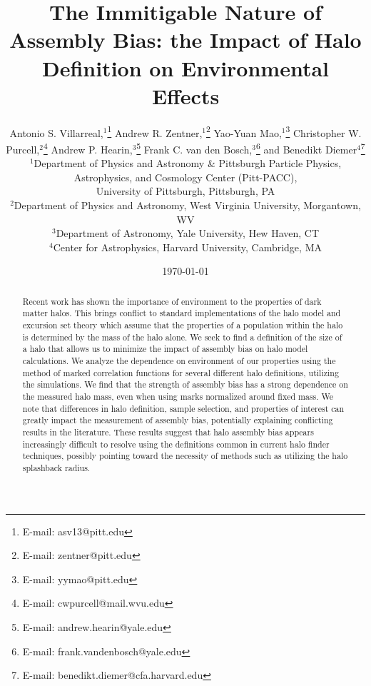 \documentclass[usenatbib,fleqn]{mnras}
\begin{document}
\title[The Immitigable Nature of Assembly Bias]{The Immitigable Nature of Assembly
Bias: the Impact of Halo Definition on Environmental Effects}
\author[A. Villarreal et al.]{%
Antonio S. Villarreal,$^{1}$\thanks{E-mail: asv13@pitt.edu}
Andrew R. Zentner,$^{1}$\thanks{E-mail: zentner@pitt.edu}
Yao-Yuan Mao,$^{1}$\thanks{E-mail: yymao@pitt.edu}
\newauthor
Christopher W. Purcell,$^{2}$\thanks{E-mail: cwpurcell@mail.wvu.edu}
Andrew P. Hearin,$^{3}$\thanks{E-mail: andrew.hearin@yale.edu}
Frank C. van den Bosch,$^{3}$\thanks{E-mail: frank.vandenbosch@yale.edu}
\newauthor
and Benedikt Diemer$^{4}$\thanks{E-mail: benedikt.diemer@cfa.harvard.edu}
\\
$^{1}$Department of Physics and Astronomy \& Pittsburgh Particle Physics, Astrophysics, and Cosmology Center (Pitt-PACC), \\
University of Pittsburgh, Pittsburgh, PA\\
$^{2}$Department of Physics and Astronomy, West Virginia University, Morgantown, WV \\
$^{3}$Department of Astronomy, Yale University, Hew Haven, CT\\
$^{4}$Center for Astrophysics, Harvard University, Cambridge, MA}

\date{\today}

\pagerange{\pageref{firstpage}--\pageref{lastpage}} 

\label{firstpage}

\maketitle

\begin{abstract}
Recent work has shown the importance of environment to the properties of dark matter halos. This brings conflict
to standard implementations of the halo model and excursion set theory which assume that the properties of a
population within the halo is determined by the mass of the halo alone. We seek to find a definition of the size
of a halo that allows us to minimize the impact of assembly bias on halo model calculations. We analyze the
dependence on environment of our properties using the method of marked correlation functions for several
different halo definitions, utilizing the \citet{diemer_kravtsov15} simulations. We find that the strength of assembly
bias has a strong dependence on the measured halo mass, even when using marks normalized around fixed mass. We note that differences in halo definition, sample selection, and properties of interest can greatly impact
the measurement of assembly bias, potentially explaining conflicting results in the literature. These results suggest that
halo assembly bias appears increasingly difficult to resolve using the definitions common in current halo finder techniques,
possibly pointing toward the necessity of methods such as utilizing the halo splashback radius.
\end{abstract}
\end{document}
